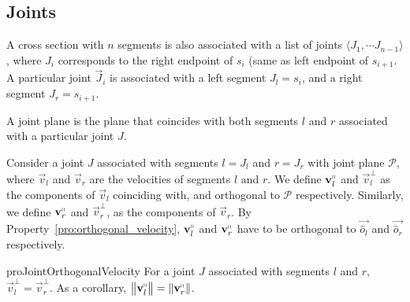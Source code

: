 \subsection{Joints}
\label{sec:joints}

\begin{definition}
\label{def:joints}
A cross section with $n$ segments is also associated with a list of joints $ \langle J_1,\cdots J_{n-1} \rangle$,
where $J_i$ corresponds to the right endpoint of $s_i$ (same as left endpoint of $s_{i+1}$.
A particular joint $\vec J_i$ is associated with a left segment $J_l = s_i$, and a right segment $J_r = s_{i+1}$.
\end{definition}

\begin{definition}
\label{def:joint_plane}
A joint plane is the plane that coincides with both segments $l$ and $r$ associated with a particular joint $J$.
\end{definition}

\begin{definition}
\label{def:joint_plane_velocity}
Consider a joint $J$ associated with segments $l = J_l$ and $r = J_r$ with joint plane $\mathcal P$,
where $\vec v_l$ and $\vec v_r$ are the velocities of segments $l$ and $r$.
We define $\vec v_l^\shortparallel$ and $\vec v_l^\perp$ as the components of $\vec v_l$ coinciding with,
and orthogonal to $\mathcal P$ respectively.
Similarly, we define $\vec v_r^\shortparallel$ and $\vec v_r^\perp$, as the components of $\vec v_r$.
By Property~\ref{pro:orthogonal_velocity}, $\vec v_l^\shortparallel$ and $\vec v_r^\shortparallel$
have to be orthogonal to $\vec{\hat o_l}$ and $\vec{\hat o_r}$ respectively.
\end{definition}

\begin{restatable}{pro}{JointOrthogonalVelocity}
\label{pro:joint_orthogonal_velocity}
For a joint $J$ associated with segments $l$ and $r$, $\vec v_l^\perp = \vec v_r^\perp$.
As a corollary, $ \left\| \vec v_l^\shortparallel\right\| = \left\| \vec v_r^\shortparallel\right\|$.
\end{restatable}
